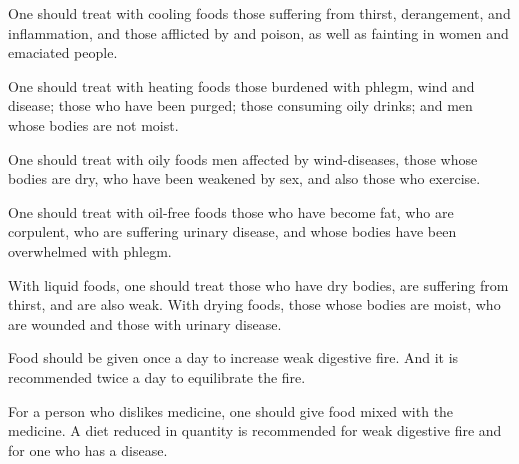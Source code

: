 \begin{translation}
	\item[77]
	One should treat with cooling foods %
	those suffering from thirst, derangement, %
	and inflammation, and %
	those afflicted by  %
	and poison,
	as well as fainting in women and emaciated people. %

	\item[78] %
	One should treat with heating foods %
	those burdened with%
	phlegm, wind and disease;
	those who have been purged; %
	those consuming oily drinks; %
	and men whose bodies are not moist. %

	\item[79] %
	One should treat with oily foods %
	men affected by wind-diseases, %
	those whose bodies are dry,
	who have been weakened by sex, %
	and also those who exercise.

	\item[80] %
	One should treat with oil-free foods %
	those who have become fat, %
	who are corpulent, %
	who are suffering urinary disease,
	and whose bodies have been overwhelmed with phlegm. %

	\item[81] %
	With liquid foods, one should treat those who have dry bodies, are suffering from thirst, and are also weak. %
	With drying foods, those whose bodies are moist, who are wounded and those with urinary disease.

	\item[82]
	Food should be given once a day to increase weak digestive fire. %
	And %
	it is recommended %
	twice a day %
	to equilibrate the fire. %

	\item[83] %
	For a person who dislikes medicine, one should give food mixed with the medicine. %
	A diet reduced in quantity is recommended for weak digestive fire and for one who has a disease.


\end{translation}
